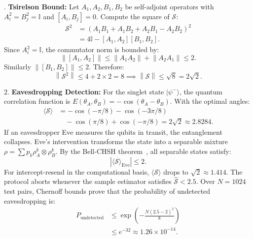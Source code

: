 \documentclass{ieeeaccess}
\newcommand{\calS}{\mathcal{S}}
\newcommand{\norm}[1]{\left\|#1\right\|}
\newenvironment{proof}{\begin{IEEEproof}\IEEEQEDoff}{\end{IEEEproof}}
\begin{document}
\begin{proof}
1. \textbf{Tsirelson Bound:}
Let $A_1, A_2, B_1, B_2$ be self-adjoint operators with $A_i^2 = B_j^2 = \mathbb{I}$ and $[A_i, B_j] = 0$.
Compute the square of $\calS$:
\begin{equation}
\begin{aligned}
  \calS^2 &= (A_1 B_1 + A_1 B_2 + A_2 B_1 - A_2 B_2)^2 \\
  &= 4 \mathbb{I} - [A_1, A_2][B_1, B_2].
\end{aligned}
\end{equation}
Since $A_i^2 = \mathbb{I}$, the commutator norm is bounded by:
\begin{equation}
  \norm{[A_1, A_2]} \leq \norm{A_1 A_2} + \norm{A_2 A_1} \leq 2.
\end{equation}
Similarly $\norm{[B_1, B_2]} \leq 2$. Therefore:
\begin{equation}
  \norm{\calS^2} \leq 4 + 2 \times 2 = 8 \implies \norm{\calS} \leq \sqrt{8} = 2\sqrt{2}.
\end{equation}

2. \textbf{Eavesdropping Detection:}
For the singlet state $|\psi^-\rangle$, the quantum correlation function is $E(\theta_A, \theta_B) = -\cos(\theta_A - \theta_B)$.
With the optimal angles:
\begin{equation}
\begin{aligned}
  \langle \calS \rangle &= -\cos(-\pi/8) - \cos(-3\pi/8) \\
  &\quad - \cos(\pi/8) + \cos(-\pi/8) = 2\sqrt{2} \approx 2.8284.
\end{aligned}
\end{equation}
If an eavesdropper Eve measures the qubits in transit, the entanglement collapses. Eve's intervention transforms the state into a separable mixture $\rho = \sum p_k \rho_A^k \otimes \rho_B^k$.
By the Bell-CHSH theorem~\cite{Tsirelson1980}, all separable states satisfy:
\begin{equation}
  |\langle \calS \rangle_{\mathrm{Eve}}| \leq 2.
\end{equation}
For intercept-resend in the computational basis, $\langle \calS \rangle$ drops to $\sqrt{2} \approx 1.414$.
The protocol aborts whenever the sample estimator satisfies $\widehat{\calS} < 2.5$.
Over $N = 1024$ test pairs, Chernoff bounds prove that the probability of undetected eavesdropping is:
\begin{equation}
\begin{aligned}
  P_{\mathrm{undetected}} &\leq \exp\left( - \frac{N (2.5 - 2)^2}{8} \right) \\
  &\leq e^{-32} \approx 1.26 \times 10^{-14}.
\end{aligned}
\end{equation}
\end{proof}
\end{document}

